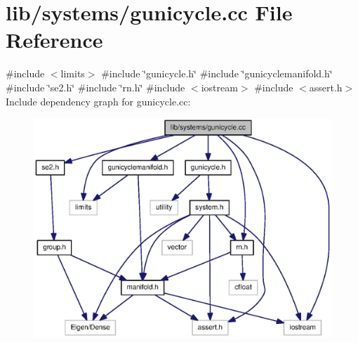 \section{lib/systems/gunicycle.cc \-File \-Reference}
\label{gunicycle_8cc}
{\ttfamily \#include $<$limits$>$}\*
{\ttfamily \#include \char`\"{}gunicycle.\-h\char`\"{}}\*
{\ttfamily \#include \char`\"{}gunicyclemanifold.\-h\char`\"{}}\*
{\ttfamily \#include \char`\"{}se2.\-h\char`\"{}}\*
{\ttfamily \#include \char`\"{}rn.\-h\char`\"{}}\*
{\ttfamily \#include $<$iostream$>$}\*
{\ttfamily \#include $<$assert.\-h$>$}\*
\-Include dependency graph for gunicycle.\-cc\-:\nopagebreak
\begin{figure}[H]
\begin{center}
\leavevmode
\includegraphics[width=350pt]{gunicycle_8cc__incl}
\end{center}
\end{figure}
